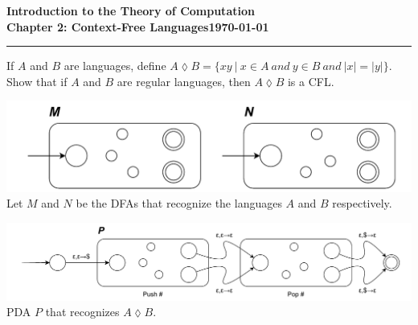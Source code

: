 \documentclass[11pt]{article}
\newcommand{\dated}{\today}
\begin{document}
\textbf{Introduction to the Theory of
Computation}\hfill\textbf{\myname}\\[0.01in]
\textbf{Chapter 2: Context-Free Languages}\hfill\textbf{\dated}\\
\smallskip\hrule\bigskip

\begin{problem}{2.44}
If $A$ and $B$ are languages, define $A \lozenge B = \{xy \ | \ x \in A \ and \ y \in B \ and \ |x| = |y|\}$.
Show that if $A$ and $B$ are regular languages, then $A \lozenge B$ is a CFL.
\end{problem}

\begin{idea}
\begin{center}
\includegraphics[scale=0.6]{Figures/Problem2.44a.pdf} \\
Let $M$ and $N$ be the DFAs that recognize the languages $A$ and $B$ respectively.
\end{center}
\begin{center}
\includegraphics[scale=0.7]{Figures/Problem2.44b.pdf} \\
PDA $P$ that recognizes $A \lozenge B$.
\end{center}
\end{idea}
\end{document}

